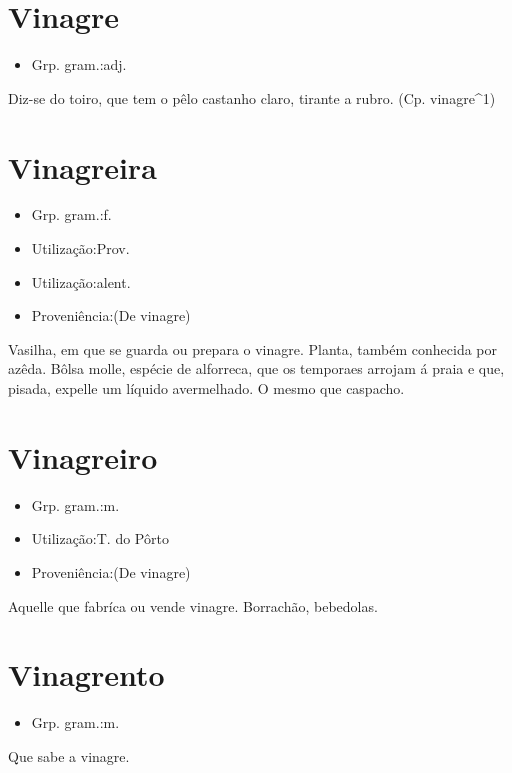 \documentclass{article}
\begin{document}
\section{Vinagre}
\begin{itemize}
\item {Grp. gram.:adj.}
\end{itemize}
Diz-se do toiro, que tem o pêlo castanho claro, tirante a rubro.
(Cp. \textunderscore vinagre\textunderscore ^1)
\section{Vinagreira}
\begin{itemize}
\item {Grp. gram.:f.}
\end{itemize}
\begin{itemize}
\item {Utilização:Prov.}
\end{itemize}
\begin{itemize}
\item {Utilização:alent.}
\end{itemize}
\begin{itemize}
\item {Proveniência:(De \textunderscore vinagre\textunderscore )}
\end{itemize}
Vasilha, em que se guarda ou prepara o vinagre.
Planta, também conhecida por \textunderscore azêda\textunderscore .
Bôlsa molle, espécie de alforreca, que os temporaes arrojam á praia e que, pisada, expelle um líquido avermelhado.
O mesmo que \textunderscore caspacho\textunderscore .
\section{Vinagreiro}
\begin{itemize}
\item {Grp. gram.:m.}
\end{itemize}
\begin{itemize}
\item {Utilização:T. do Pôrto}
\end{itemize}
\begin{itemize}
\item {Proveniência:(De \textunderscore vinagre\textunderscore )}
\end{itemize}
Aquelle que fabríca ou vende vinagre.
Borrachão, bebedolas.
\section{Vinagrento}
\begin{itemize}
\item {Grp. gram.:m.}
\end{itemize}
Que sabe a vinagre.
\end{document}
